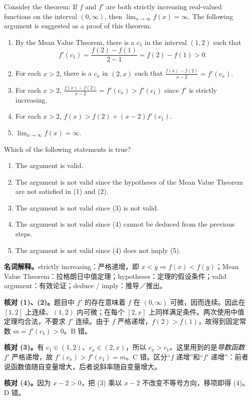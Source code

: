 \documentclass[11pt,a4paper,fontset=fandol]{ctexart}
\begin{document}
Consider the theorem: If $f$ and $f'$ are both strictly increasing real-valued functions on the interval $(0,\infty)$, then $\lim_{x\to\infty}f(x)=\infty$. The following argument is suggested as a proof of this theorem.
\begin{enumerate}[label=(\arabic*)]
\item By the Mean Value Theorem, there is a $c_1$ in the interval $(1,2)$ such that
\[
f'(c_1)=\frac{f(2)-f(1)}{2-1}=f(2)-f(1)>0.
\]
\item For each $x>2$, there is a $c_x$ in $(2,x)$ such that $\frac{f(x)-f(2)}{x-2}=f'(c_x)$.
\item For each $x>2$, $\frac{f(x)-f(2)}{x-2}=f'(c_x)>f'(c_1)$ since $f'$ is strictly increasing.
\item For each $x>2$, $f(x)>f(2)+(x-2)f'(c_1)$.
\item $\lim_{x\to\infty}f(x)=\infty$.
\end{enumerate}
Which of the following statements is true?
\begin{enumerate}[label=(\Alph*)]
\item The argument is valid.
\item The argument is not valid since the hypotheses of the Mean Value Theorem are not satisfied in (1) and (2).
\item The argument is not valid since (3) is not valid.
\item The argument is not valid since (4) cannot be deduced from the previous steps.
\item The argument is not valid since (4) does not imply (5).
\end{enumerate}
\textbf{名词解释。}strictly increasing：严格递增，即 $x<y\Rightarrow f(x)<f(y)$；Mean Value Theorem：拉格朗日中值定理；hypotheses：定理的假设条件；valid argument：有效论证；deduce / imply：推导／推出。

\textbf{核对 (1)、(2)。}题目中 $f'$ 的存在意味着 $f$ 在 $(0,\infty)$ 可微，因而连续。因此在 $[1,2]$ 上连续、$(1,2)$ 内可微；在每个 $[2,x]$ 上同样满足条件。两次使用中值定理均合法，不要求 $f'$ 连续。由于 $f$ 严格递增，$f(2)>f(1)$，故得到固定常数 $m=f'(c_1)>0$。B 错。

\textbf{核对 (3)。}有 $c_1\in(1,2)$、$c_x\in(2,x)$，所以 $c_x>c_1$。这里用到的是\emph{导数函数} $f'$ 严格递增，故 $f'(c_x)>f'(c_1)=m$。C 错。区分“$f$ 递增”和“$f'$ 递增”：前者说函数值随自变量增大，后者说斜率随自变量增大。

\textbf{核对 (4)。}因为 $x-2>0$，把 (3) 乘以 $x-2$ 不改变不等号方向，移项即得 (4)。D 错。
\end{document}
